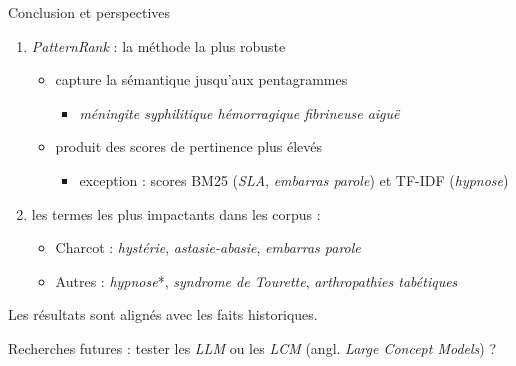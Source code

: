 \begin{frame}{Conclusion et perspectives}
	\begin{enumerate}
		\item 	\textit{PatternRank} : la méthode la plus robuste
		\begin{itemize}
			\item capture la sémantique jusqu'aux pentagrammes
			\begin{itemize}
				\item \textit{méningite syphilitique hémorragique fibrineuse aiguë}
			\end{itemize}
			\item produit des scores de pertinence plus élevés
			\begin{itemize}
				\item exception : scores BM25 (\textit{SLA}, \textit{embarras parole}) et TF-IDF (\textit{hypnose})
			\end{itemize}
		\end{itemize}
		
		\item 	les termes les plus impactants dans les corpus :
		\begin{itemize}
			\item Charcot : \textit{hystérie}, \textit{astasie-abasie}, \textit{embarras parole}
			\item Autres :  \textit{hypnose}*, \textit{syndrome de Tourette}, \textit{arthropathies tabétiques}
		\end{itemize}

	\end{enumerate}
	
	\begin{alertblock}{\vspace*{-0.6mm}}
		\centering
		Les résultats sont alignés avec les faits historiques.
	\end{alertblock}
	
	\bigskip
	Recherches futures : tester les \textit{LLM} ou les \textit{LCM} (angl. \textit{Large Concept Models}) ?
\end{frame}